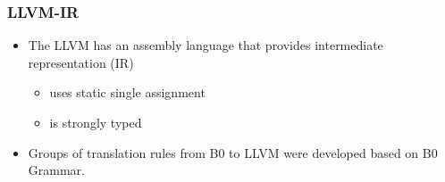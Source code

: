 \documentclass[12pt]{beamer}
\begin{document}
%


%
%


\begin{frame} \frametitle{LLVM-IR}

	\begin{itemize}
	\item The LLVM has an assembly language that provides intermediate representation (IR)
		\begin{itemize}
			\item uses static single assignment 
			\item is strongly typed 
		\end{itemize}

	\item Groups of translation rules from B0 to LLVM were developed based on B0 Grammar.
	\end{itemize}
	
\end{frame}
\end{document}
